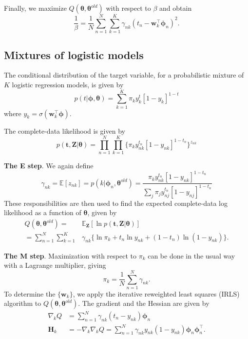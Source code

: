 \documentclass[a4paper]{book}
\renewcommand{\bf}{\mathbf}
\newcommand{\bb}{\mathbb}
\newcommand{\bs}{\boldsymbol}
\begin{document}
Finally, we maximize $Q(\bs{\theta},\bs{\theta}^{old})$ with respect to $\beta$ and obtain
\begin{equation}
	\frac{1}{\beta} = \frac{1}{N} \sum_{n=1}^N \sum_{k=1}^K \gamma_{nk}(t_n - \bf{w}_k^{\intercal} \bs{\phi}_n)^2.
\end{equation}
\subsection{Mixtures of logistic models}
The conditional distribution of the target variable, for a probabilistic mixture of $K$ logistic regression models, is given by
\begin{equation}
	p(t|\bs{\phi,\theta}) = \sum_{k=1}^K \pi_k y_k^t[1-y_k]^{1-t}
\end{equation}
where $y_k = \sigma(\bf{w}_k^{\intercal} \bs{\phi})$.

The complete-data likelihood is given by
\begin{equation}
	p(\bf{t,Z}|\bs{\theta}) = \prod_{n=1}^N \prod_{k=1}^K \{ \pi_k y_{nk}^{t_n}[1-y_{nk}]^{1-t_n} \}^{z_{nk}}
\end{equation}

\textbf{The E step}. We again define
\begin{equation}
	\gamma_{nk} = \bb{E}[z_{nk}] = p(k|\bs{\phi}_n,\bs{\theta}^{old}) = \frac{\pi_k y_{nk}^{t_n}[1-y_{nk}]^{1-t_n}}{\sum_j \pi_j y_{nj}^{t_n}[1-y_{nj}]^{1-t_n}}
\end{equation}
These responsibilities are then used to find the expected complete-data log likelihood as a function of $\bs{\theta}$, given by
\begin{align}
	Q(\bs{\theta},\bs{\theta}^{old}) = &\bb{E}_{\bf{Z}}[\ln p(\bf{t,Z}|\bs{\theta})] \\
	=\sum_{n=1}^N \sum_{k=1}^K & \gamma_{nk} \{ \ln \pi_k + t_n \ln y_{nk}+(1-t_n)\ln(1-y_{nk}) \}.
\end{align}

\textbf{The M step}. Maximization with respect to $\pi_k$ can be done in the usual way with a Lagrange multiplier, giving
\begin{equation}
\pi_k = \frac{1}{N} \sum_{n=1}^N \gamma_{nk}.
\end{equation}
To determine the $\{ \bf{w}_k\}$, we apply the iterative reweighted least squares (IRLS) algorithm to $Q(\bs{\theta},\bs{\theta}^{old})$. The gradient and the Hessian are given by
\begin{align}
	\nabla_k Q &= \sum_{n=1}^N \gamma_{nk} (t_n-y_{nk})\bs{\phi}_n \\
	\bf{H}_k &= - \nabla_k \nabla_k Q = \sum_{n=1}^N \gamma_{nk} y_{nk} (1-y_{nk}) \bs{\phi}_n \bs{\phi}_n^{\intercal}.
\end{align}
\end{document}
